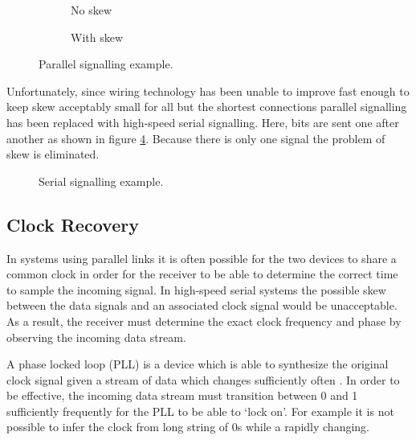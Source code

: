 			\begin{figure}
				\begin{subfigure}[b]{0.49\textwidth}
					\center
					
					\caption{No skew}
					\label{fig:parallel-example-no-skew}
				\end{subfigure}
				\begin{subfigure}[b]{0.49\textwidth}
					\center
					
					\caption{With skew}
					\label{fig:parallel-example-skew}
				\end{subfigure}
				
				\caption{Parallel signalling example.}
				\label{fig:parallel-example}
			\end{figure}
			
			Unfortunately, since wiring technology has been unable to improve fast
			enough to keep skew acceptably small for all but the shortest connections
			parallel signalling has been replaced with high-speed serial signalling.
			Here, bits are sent one after another as shown in figure
			\ref{fig:serial-example}. Because there is only one signal the problem of
			skew is eliminated.
			
			\begin{figure}
				\center
				\begin{tikzpicture}
					
				\end{tikzpicture}
				
				\caption{Serial signalling example.}
				\label{fig:serial-example}
			\end{figure}
		
		
		\subsection{Clock Recovery}
			
			In systems using parallel links it is often possible for the two devices
			to share a common clock in order for the receiver to be able to determine
			the correct time to sample the incoming signal. In high-speed serial
			systems the possible skew between the data signals and an associated clock
			signal would be unacceptable. As a result, the receiver must determine the
			exact clock frequency and phase by observing the incoming data stream.
			
			A phase locked loop (PLL) is a device which is able to synthesize the
			original clock signal given a stream of data which changes sufficiently
			often \cite{athavale05}. In order to be effective, the incoming data
			stream must transition between 0 and 1 sufficiently frequently for the PLL
			to be able to `lock on'. For example it is not possible to infer the clock
			from long string of 0s while a rapidly changing.
			

